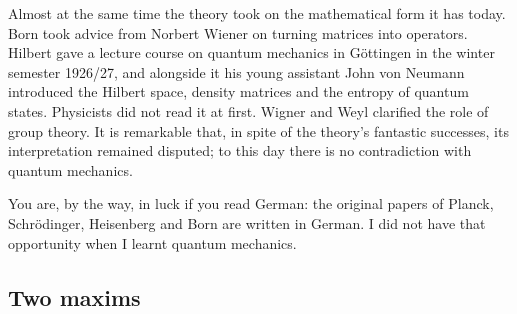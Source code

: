 \begin{vertiefung}
  Almost at the same time the theory took on the mathematical form it has today. Born took
  advice from Norbert Wiener on turning matrices into operators. Hilbert gave a lecture
  course on quantum mechanics in Göttingen in the winter semester 1926/27, and alongside it
  his young assistant John von Neumann introduced the Hilbert space, density matrices and the
  entropy of quantum states. Physicists did not read it at first. Wigner and Weyl clarified
  the role of group theory. It is remarkable that, in spite of the theory's fantastic
  successes, its interpretation remained disputed; to this day there is no contradiction
  with quantum mechanics.

  \begin{historical}
    You are, by the way, in luck if you read German: the original papers of Planck,
    Schrödinger, Heisenberg and Born are written in German. I did not have that opportunity
    when I learnt quantum mechanics.
  \end{historical}
\end{vertiefung}

\subsection{Two maxims}\label{c00.s4.4}

